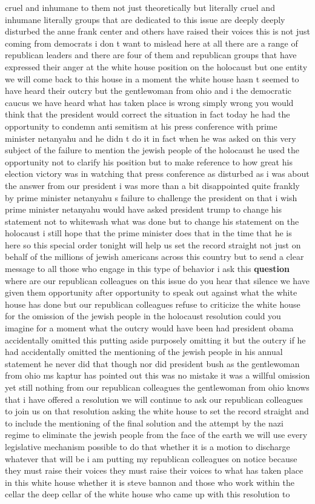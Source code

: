 \documentclass{article}
\begin{document}
cruel and inhumane to them not just theoretically but literally cruel and inhumane literally groups that are dedicated to this issue are deeply deeply disturbed the anne frank center and others have raised their voices this is not just coming from democrats i don t want to mislead here at all there are a range of republican leaders and there are four of them and republican groups that have expressed their anger at the white house position on the holocaust but one entity we will come back to this house in a moment the white house hasn t seemed to have heard their outcry but the gentlewoman from ohio and i the democratic caucus we have heard what has taken place is wrong simply wrong you would think that the president would correct the situation in fact today he had the opportunity to condemn anti semitism at his press conference with prime minister netanyahu and he didn t do it in fact when he was asked on this very subject of the failure to mention the jewish people of the holocaust he used the opportunity not to clarify his position but to make reference to how great his election victory was in watching that press conference as disturbed as i was about the answer from our president i was more than a bit disappointed quite frankly by prime minister netanyahu s failure to challenge the president on that i wish prime minister netanyahu would have asked president trump to change his statement not to whitewash what was done but to change his statement on the holocaust i still hope that the prime minister does that in the time that he is here so this special order tonight will help us set the record straight not just on behalf of the millions of jewish americans across this country but to send a clear message to all those who engage in this type of behavior i ask this {\bf \color{red} question} where are our republican colleagues on this issue do you hear that silence we have given them opportunity after opportunity to speak out against what the white house has done but our republican colleagues refuse to criticize the white house for the omission of the jewish people in the holocaust resolution could you imagine for a moment what the outcry would have been had president obama accidentally omitted this putting aside purposely omitting it but the outcry if he had accidentally omitted the mentioning of the jewish people in his annual statement he never did that though nor did president bush as the gentlewoman from ohio ms kaptur has pointed out this was no mistake it was a willful omission yet still nothing from our republican colleagues the gentlewoman from ohio knows that i have offered a resolution we will continue to ask our republican colleagues to join us on that resolution asking the white house to set the record straight and to include the mentioning of the final solution and the attempt by the nazi regime to eliminate the jewish people from the face of the earth we will use every legislative mechanism possible to do that whether it is a motion to discharge whatever that will be i am putting my republican colleagues on notice because they must raise their voices they must raise their voices to what has taken place in this white house whether it is steve bannon and those who work within the cellar the deep cellar of the white house who came up with this resolution to 
\end{document}
